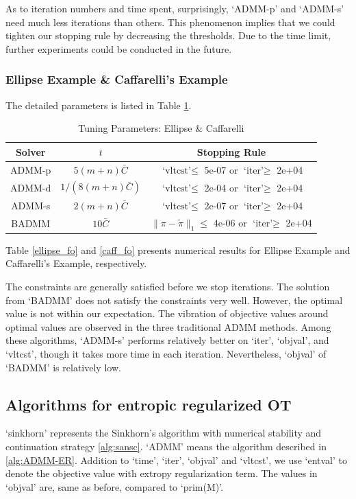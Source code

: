 As to iteration numbers and time spent, surprisingly, `ADMM-p' and `ADMM-s' need much less iterations than others. This phenomenon implies that we could tighten our stopping rule by decreasing the thresholds. Due to the time limit, further experiments could be conducted in the future.

\subsubsection{Ellipse Example \& Caffarelli's Example}
The detailed parameters is listed in Table \ref{param_ellcaff_fo}. 
\begin{table}[htbp]
\centering
\caption{Tuning Parameters: Ellipse \& Caffarelli}
\label{param_ellcaff_fo}
\begin{tabular}{|c|c|c|}
\hline 
Solver & $t$ & Stopping Rule \\
\hline
ADMM-p & $5(m+n)\bar C$ & $\text{`vltcst'}\leqslant$ 5e-07 or $\text{`iter'}\geqslant$ 2e+04 \\\hline
ADMM-d & $1/(8(m+n)\bar C)$ & $\text{`vltcst'}\leqslant$ 2e-04 or $\text{`iter'}\geqslant$ 2e+04 \\\hline
ADMM-s & $2(m+n)\bar C$ & $\text{`vltcst'}\leqslant$ 2e-07 or $\text{`iter'}\geqslant$ 2e+04 \\\hline
BADMM & $10\bar C$ & $\|\pi-\tilde\pi\|_1\leqslant$ 4e-06 or $\text{`iter'}\geqslant$ 2e+04 \\
\hline
\end{tabular}
\end{table}




Table \ref{ellipse_fo} and \ref{caff_fo} presents numerical results for Ellipse Example and Caffarelli's Example, respectively.

The constraints are generally satisfied before we stop iterations. The solution from `BADMM' does not satisfy the constraints very well. However, the optimal value is not within our expectation. The vibration of objective values around optimal values are observed in the three traditional ADMM methods. Among these algorithms, `ADMM-s' performs relatively better on `iter', `objval', and `vltcst', though it takes more time in each iteration. Nevertheless, `objval' of `BADMM' is relatively low.

\subsection{Algorithms for entropic regularized OT}
`sinkhorn' represents the Sinkhorn's algorithm with numerical stability and continuation strategy \ref{alg:sansc}. `ADMM' means the algorithm described in \ref{alg:ADMM-ER}. Addition to `time', `iter', `objval' and `vltcst', we use `entval' to denote the objective value with extropy regularization term. The values in `objval' are, same as before, compared to `prim(M)'.

